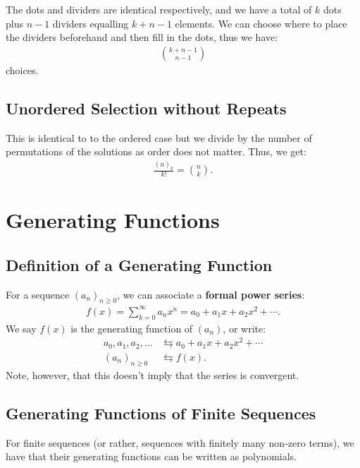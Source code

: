 \documentclass[a4paper, 12pt, twoside]{article}
\begin{document}
\newpage

The dots and dividers are identical respectively, and we
have a total of $k$ dots plus $n - 1$ dividers equalling $k + n - 1$
elements. We can choose where to place the dividers beforehand and
then fill in the dots, thus we have: \begin{gather*}
  {k + n - 1 \choose n - 1}
\end{gather*} choices.

\subsection{Unordered Selection without Repeats}

This is identical to to the ordered case but we divide by the number
of permutations of the solutions as order does not matter. Thus, we get:
\begin{gather*}
  \frac{(n)_k}{k!} = {n \choose k}.
\end{gather*}

\vfill

\section{Generating Functions}

\subsection{Definition of a Generating Function}

For a sequence $(a_n)_{n \geq 0}$, we
can associate a \textbf{formal power series}: \begin{gather*}
  f(x) = \sum_{k = 0}^\infty a_nx^n = a_0 + a_1x + a_2x^2 + \cdots.
\end{gather*} We say $f(x)$ is the generating function of $(a_n)$,
or write: \begin{align*}
  a_0, a_1, a_2, \ldots &\leftrightarrows a_0 + a_1x + a_2x^2 + \cdots \\
  (a_n)_{n \geq 0} &\leftrightarrows f(x).
\end{align*} Note, however, that this doesn't imply that the series is convergent.

\subsection{Generating Functions of Finite Sequences}

For finite sequences (or rather, sequences with finitely many
non-zero terms), we have that their generating functions
can be written as polynomials.
\end{document}
